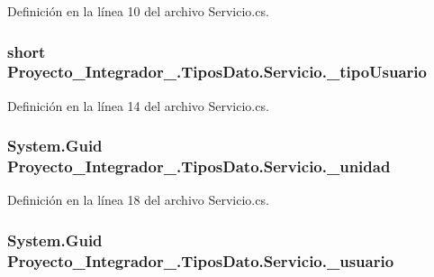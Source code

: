 Definición en la línea 10 del archivo Servicio.\-cs.

\hypertarget{class_proyecto___integrador__3_1_1_tipos_dato_1_1_servicio_a2787eb24fd380da2cd0abe7b0e87ce2e}{
\subsubsection[{\-\_\-tipo\-Usuario}]{\setlength{\rightskip}{0pt plus 5cm}short Proyecto\-\_\-\-Integrador\-\_.\-Tipos\-Dato.\-Servicio.\-\_\-tipo\-Usuario\hspace{0.3cm}{\ttfamily [private]}}}\label{class_proyecto___integrador__3_1_1_tipos_dato_1_1_servicio_a2787eb24fd380da2cd0abe7b0e87ce2e}


Definición en la línea 14 del archivo Servicio.\-cs.

\hypertarget{class_proyecto___integrador__3_1_1_tipos_dato_1_1_servicio_a4963d49bd3ca49ff2223c7a37469a23f}{
\subsubsection[{\-\_\-unidad}]{\setlength{\rightskip}{0pt plus 5cm}System.\-Guid Proyecto\-\_\-\-Integrador\-\_.\-Tipos\-Dato.\-Servicio.\-\_\-unidad\hspace{0.3cm}{\ttfamily [private]}}}\label{class_proyecto___integrador__3_1_1_tipos_dato_1_1_servicio_a4963d49bd3ca49ff2223c7a37469a23f}


Definición en la línea 18 del archivo Servicio.\-cs.

\hypertarget{class_proyecto___integrador__3_1_1_tipos_dato_1_1_servicio_aea0939faf5d7273f1cb5a9cf7fd88896}{
\subsubsection[{\-\_\-usuario}]{\setlength{\rightskip}{0pt plus 5cm}System.\-Guid Proyecto\-\_\-\-Integrador\-\_.\-Tipos\-Dato.\-Servicio.\-\_\-usuario\hspace{0.3cm}{\ttfamily [private]}}}\label{class_proyecto___integrador__3_1_1_tipos_dato_1_1_servicio_aea0939faf5d7273f1cb5a9cf7fd88896}


